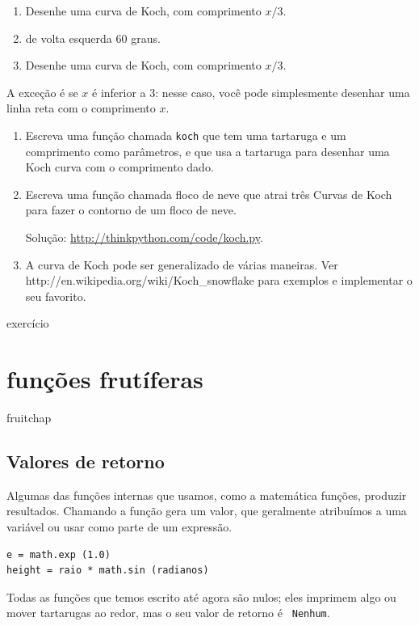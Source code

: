 \documentclass[10pt]{book}
\begin{document}
{{\begin{}
\begin{enumerate}
\item Desenhe uma curva de Koch, com comprimento $ x / 3 $.

\item de volta esquerda 60 graus.

\item Desenhe uma curva de Koch, com comprimento $ x / 3 $.

\end{enumerate}

A exceção é se $ x $ é inferior a 3: nesse caso,
você pode simplesmente desenhar uma linha reta com o comprimento $ x $.

\begin{enumerate}

\item Escreva uma função chamada {\tt koch} que tem uma tartaruga e
um comprimento como parâmetros, e que usa a tartaruga para desenhar uma Koch
curva com o comprimento dado.

\item Escreva uma função chamada {\tt} floco de neve que atrai três
Curvas de Koch para fazer o contorno de um floco de neve.

Solução: \url{http://thinkpython.com/code/koch.py}.

\item A curva de Koch pode ser generalizado de várias maneiras. Ver
\url{} http://en.wikipedia.org/wiki/Koch_snowflake para exemplos e
implementar o seu favorito.

\end{enumerate}
\end{} exercício


\chapter{funções frutíferas}
\label{} fruitchap

\section{Valores de retorno}

Algumas das funções internas que usamos, como a matemática
funções, produzir resultados. Chamando a função gera um
valor, que geralmente atribuímos a uma variável ou usar como parte de um
expressão.

\begin{verbatim}
e = math.exp (1.0)
height = raio * math.sin (radianos)
\end{verbatim}
%
Todas as funções que temos escrito até agora são nulos; eles imprimem
algo ou mover tartarugas ao redor, mas o seu valor de retorno é {\tt
Nenhum}.

}}
\end{document}
